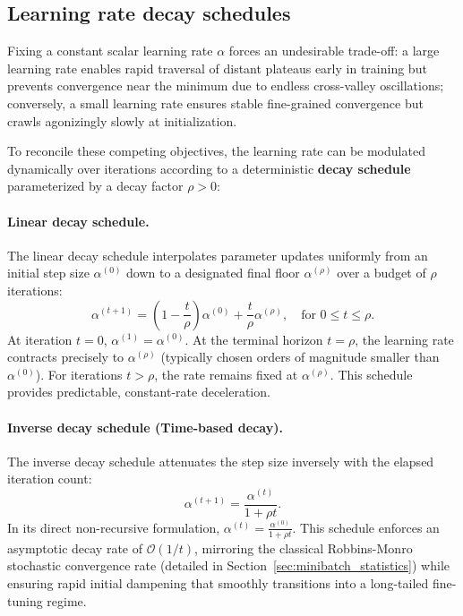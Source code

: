 \subsection{Learning rate decay schedules}
\label{sec:learning_rate_decay_schedules}

Fixing a constant scalar learning rate $\alpha$ forces an undesirable trade-off: a large learning rate enables rapid traversal of distant plateaus early in training but prevents convergence near the minimum due to endless cross-valley oscillations; conversely, a small learning rate ensures stable fine-grained convergence but crawls agonizingly slowly at initialization.

To reconcile these competing objectives, the learning rate can be modulated dynamically over iterations according to a deterministic \textbf{decay schedule} parameterized by a decay factor $\rho > 0$:

\paragraph{Linear decay schedule.}
The linear decay schedule interpolates parameter updates uniformly from an initial step size $\alpha^{(0)}$ down to a designated final floor $\alpha^{(\rho)}$ over a budget of $\rho$ iterations:
\begin{equation}
\alpha^{(t+1)} = \left(1 - \frac{t}{\rho}\right)\alpha^{(0)} + \frac{t}{\rho}\alpha^{(\rho)}, \quad \text{for } 0 \le t \le \rho.
\label{eq:linear_decay_schedule}
\end{equation}
At iteration $t = 0$, $\alpha^{(1)} = \alpha^{(0)}$. At the terminal horizon $t = \rho$, the learning rate contracts precisely to $\alpha^{(\rho)}$ (typically chosen orders of magnitude smaller than $\alpha^{(0)}$). For iterations $t > \rho$, the rate remains fixed at $\alpha^{(\rho)}$. This schedule provides predictable, constant-rate deceleration.

\paragraph{Inverse decay schedule (Time-based decay).}
The inverse decay schedule attenuates the step size inversely with the elapsed iteration count:
\begin{equation}
\alpha^{(t+1)} = \frac{\alpha^{(t)}}{1 + \rho t}.
\label{eq:inverse_decay_schedule}
\end{equation}
In its direct non-recursive formulation, $\alpha^{(t)} = \frac{\alpha^{(0)}}{1 + \rho t}$. This schedule enforces an asymptotic decay rate of $\mathcal{O}(1/t)$, mirroring the classical Robbins-Monro stochastic convergence rate (detailed in Section~\ref{sec:minibatch_statistics}) while ensuring rapid initial dampening that smoothly transitions into a long-tailed fine-tuning regime.

